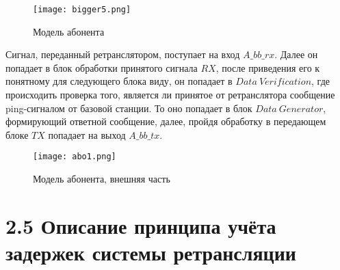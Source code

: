 \begin{figure}[h!]
	\centering
	\texttt{[image: bigger5.png]}
	\caption{Модель абонента}
	\label{fig:model17}
\end{figure}


Сигнал, переданный ретранслятором, поступает на вход $A\_bb\_rx$. Далее он попадает в блок обработки принятого сигнала $RX$, после приведения его к понятному для следующего блока виду, он попадает в $Data \ Verification$, где происходить проверка того, является ли принятое от ретранслятора сообщение ping-сигналом от базовой станции. То оно попадает в блок $Data \ Generator$, формирующий ответной сообщение, далее, пройдя обработку в передающем блоке $TX$ попадает на выход $A\_bb\_tx$. 


\begin{figure}[h!]
	\centering
	\texttt{[image: abo1.png]}
	\caption{Модель абонента, внешняя часть}
	\label{fig:model18}
\end{figure}


\newpage
\section*{\large{2.5 Описание принципа учёта задержек системы ретрансляции}}

